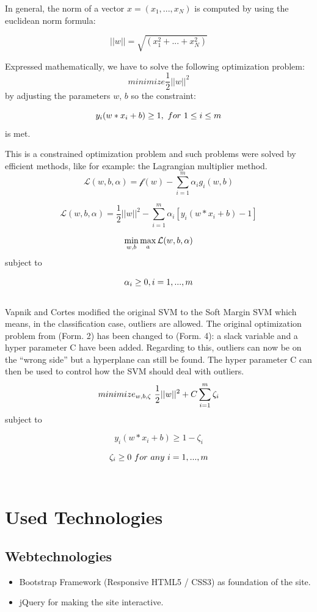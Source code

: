 \documentclass{scrartcl}
\begin{document}
In general, the norm of a vector $x = (x_1,...,x_N)$ is computed by using the euclidean norm formula: 

\[||w||=\sqrt{(x_{1}^{2}+...+x_{N}^{2})}\]

Expressed mathematically, we have to solve the following optimization problem: 
\[minimize \frac{1}{2}||w||^{2} \]
by adjusting the parameters $w$, $b$ so the constraint:

\[y_{i}(w * x_{i} + b) \geq 1,~ \space for~ \space 1 \leq i \leq m \] is met.


This is a constrained optimization problem and such problems were solved by efficient methods, like for example: the Lagrangian multiplier method.\\

\[
	\mathcal{L}(w,b,\alpha) = \mathcal{f}(w)-\sum_{i=1}^{m}\alpha_{i}g_{i}(w,b)
\]

\[
	\mathcal{L}(w,b,\alpha) = \frac{1}{2}||w||^{2}-\sum_{i=1}^{m}\alpha_{i}[y_{i}(w*x_{i}+b)-1]
\]

\[
	\min_{w,b} \space \max_{a} \mathcal{L}(w,b,\alpha)
\]
subject to

\[
	\alpha_{i}\geq0, \space i=1,...,m \label{ref4}
\]
\\
Vapnik and Cortes modified the original SVM to the Soft Margin SVM which means, in the classification case, outliers are allowed. The original optimization problem from (Form. 2) has been changed to (Form. 4): a slack variable and a hyper parameter C have been added. Regarding to this, outliers can now be on the “wrong side” but a hyperplane can still be found. The hyper parameter C can then be used to control how the SVM should deal with outliers. \\

\[
	minimize_{w,b,\zeta}~ \space \frac{1}{2}||w||^{2} + C \sum_{i=1}^{m} \zeta_{i} \label{ref8}
\]
subject to

\[
	y_{i}(w*x_{i}+b) \geq 1-\zeta_{i}
\]

\[
	\zeta_{i} \geq 0~ \space for~ \space any~ \space i=1,...,m
\]
\\


\section{Used Technologies}

\subsection{Webtechnologies}
\begin{itemize}
	\item Bootstrap Framework (Responsive HTML5 / CSS3)  as foundation of the site. 
	\item jQuery for making the site interactive.
\end{itemize}
\end{document}
